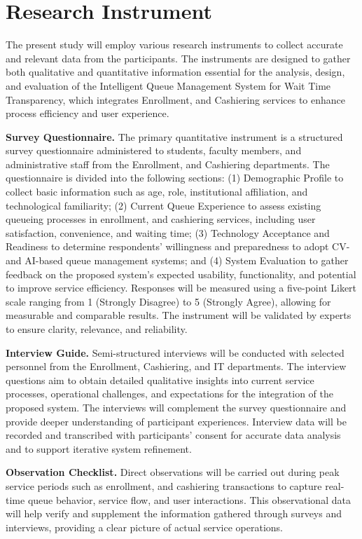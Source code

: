 \documentclass{research}
\begin{document}
\section{Research Instrument}

\hspace{1em}The present study will employ various research instruments to collect accurate and relevant data from the participants. The instruments are designed to gather both qualitative and quantitative information essential for the analysis, design, and evaluation of the Intelligent Queue Management System for Wait Time Transparency, which integrates Enrollment, and Cashiering services to enhance process efficiency and user experience.

\medskip
\textbf{Survey Questionnaire.} The primary quantitative instrument is a structured survey questionnaire administered to students, faculty members, and administrative staff from the Enrollment, and Cashiering departments. The questionnaire is divided into the following sections: (1) Demographic Profile to collect basic information such as age, role, institutional affiliation, and technological familiarity; (2) Current Queue Experience to assess existing queueing processes in enrollment, and cashiering services, including user satisfaction, convenience, and waiting time; (3) Technology Acceptance and Readiness to determine respondents' willingness and preparedness to adopt CV- and AI-based queue management systems; and (4) System Evaluation to gather feedback on the proposed system's expected usability, functionality, and potential to improve service efficiency. Responses will be measured using a five-point Likert scale ranging from 1 (Strongly Disagree) to 5 (Strongly Agree), allowing for measurable and comparable results. The instrument will be validated by experts to ensure clarity, relevance, and reliability.

\medskip
\textbf{Interview Guide.} Semi-structured interviews will be conducted with selected personnel from the Enrollment, Cashiering, and IT departments. The interview questions aim to obtain detailed qualitative insights into current service processes, operational challenges, and expectations for the integration of the proposed system. The interviews will complement the survey questionnaire and provide deeper understanding of participant experiences. Interview data will be recorded and transcribed with participants' consent for accurate data analysis and to support iterative system refinement.

\medskip
\textbf{Observation Checklist.} Direct observations will be carried out during peak service periods such as enrollment, and cashiering transactions to capture real-time queue behavior, service flow, and user interactions. This observational data will help verify and supplement the information gathered through surveys and interviews, providing a clear picture of actual service operations.
\end{document}
